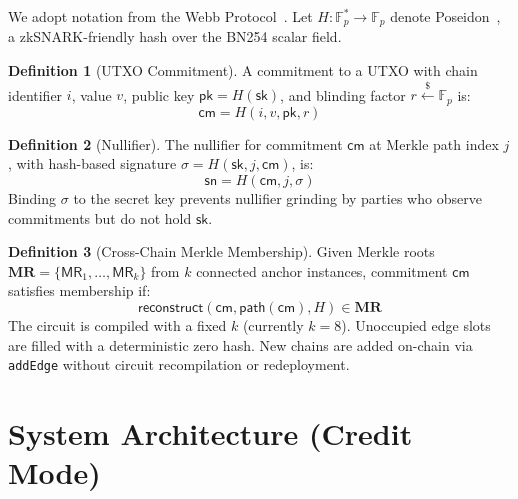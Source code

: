 \documentclass[11pt,a4paper]{article}
\theoremstyle{definition}
\newtheorem{definition}{Definition}
\begin{document}
We adopt notation from the Webb Protocol~\cite{webb}. Let $H : \mathbb{F}_p^* \to \mathbb{F}_p$ denote Poseidon~\cite{poseidon}, a zkSNARK-friendly hash over the BN254 scalar field.

\begin{definition}[UTXO Commitment]
A commitment to a UTXO with chain identifier $i$, value $v$, public key $\mathsf{pk} = H(\mathsf{sk})$, and blinding factor $r \xleftarrow{\$} \mathbb{F}_p$ is:
$$\mathsf{cm} = H(i, v, \mathsf{pk}, r)$$
\end{definition}

\begin{definition}[Nullifier]
The nullifier for commitment $\mathsf{cm}$ at Merkle path index $j$, with hash-based signature $\sigma = H(\mathsf{sk}, j, \mathsf{cm})$, is:
$$\mathsf{sn} = H(\mathsf{cm}, j, \sigma)$$
Binding $\sigma$ to the secret key prevents nullifier grinding by parties who observe commitments but do not hold $\mathsf{sk}$.
\end{definition}

\begin{definition}[Cross-Chain Merkle Membership]
Given Merkle roots $\mathbf{MR} = \{\mathsf{MR}_1, \ldots, \mathsf{MR}_k\}$ from $k$ connected anchor instances, commitment $\mathsf{cm}$ satisfies membership if:
$$\mathsf{reconstruct}(\mathsf{cm}, \mathsf{path}(\mathsf{cm}), H) \in \mathbf{MR}$$
The circuit is compiled with a fixed $k$ (currently $k=8$). Unoccupied edge slots are filled with a deterministic zero hash. New chains are added on-chain via \texttt{addEdge} without circuit recompilation or redeployment.
\end{definition}

\section{System Architecture (Credit Mode)}
\end{document}
